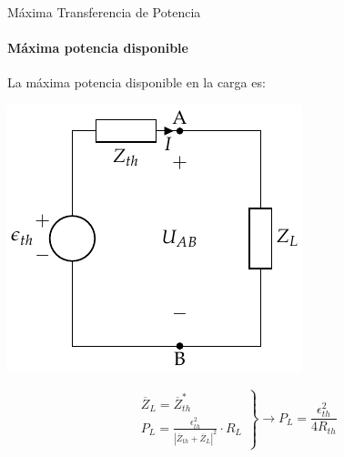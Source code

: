 \documentclass[aspectratio=169, usenames,svgnames,dvipsnames]{beamer}
\begin{document}
\begin{frame}[label={sec:orga75382e}]{Máxima Transferencia de Potencia}
\framesubtitle{Máxima potencia disponible}

La máxima potencia disponible en la carga es:
\begin{center}
\includegraphics[height=0.45\textheight]{../figs/EquivalenteThevenin.pdf}
\end{center}

\begin{equation*}
  \left.
    \begin{matrix}
      \overline{Z}_L = \overline{Z}_{th}^*\\
      P_L = \frac{\epsilon^2_{th}}{|\overline{Z}_{th} + \overline{Z}_L|^2} \cdot R_L
    \end{matrix} \right\}\rightarrow
  \boxed{P_L = \frac{\epsilon^2_{th}}{4 R_{th}}}
\end{equation*}
\end{frame}
\end{document}
